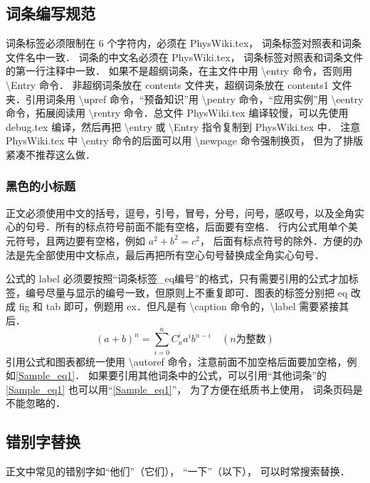 \subsection{词条编写规范}

词条标签必须限制在 6 个字符内，必须在 PhysWiki.tex， 词条标签对照表和词条文件名中一致． 词条的中文名必须在 PhysWiki.tex， 词条标签对照表和词条文件的第一行注释中一致． 如果不是超纲词条，在主文件中用 \textbackslash entry 命令，否则用 \textbackslash Entry 命令． 非超纲词条放在 contents 文件夹，超纲词条放在 contents1 文件夹．引用词条用 \textbackslash upref 命令，“预备知识”用 \textbackslash pentry 命令，“应用实例”用 \textbackslash eentry 命令，拓展阅读用 \textbackslash rentry 命令．总文件 PhysWiki.tex 编译较慢，可以先使用 debug.tex 编译，然后再把 \textbackslash entry 或 \textbackslash Entry 指令复制到 PhysWiki.tex 中． 注意 PhysWiki.tex 中 \textbackslash entry 命令的后面可以用 \textbackslash newpage 命令强制换页， 但为了排版紧凑不推荐这么做．

\subsubsection{黑色的小标题}

正文必须使用中文的括号，逗号，引号，冒号，分号，问号，感叹号，以及全角实心的句号．所有的标点符号前面不能有空格，后面要有空格． 行内公式用单个美元符号，且两边要有空格，例如 $a^2+b^2=c^2$， 后面有标点符号的除外．方便的办法是先全部使用中文标点，最后再把所有空心句号替换成全角实心句号．

公式的 label 必须要按照“词条标签\_eq编号”的格式，只有需要引用的公式才加标签，编号尽量与显示的编号一致，但原则上不重复即可．图表的标签分别把 eq 改成 fig 和 tab 即可，例题用 ex．但凡是有 \textbackslash caption 命令的，\textbackslash label 需要紧接其后．
\begin{equation}\label{Sample_eq1}
(a+b)^n = \sum_{i=0}^n C_n^i a^i b^{n-i} \quad (n\text{为整数})
\end{equation}
引用公式和图表都统一使用 \textbackslash autoref 命令，注意前面不加空格后面要加空格，例如\autoref{Sample_eq1}． 如果要引用其他词条中的公式，可以引用“其他词条”的\autoref{Sample_eq1} 也可以用“\autoref{Sample_eq1}”， 为了方便在纸质书上使用， 词条页码是不能忽略的．

\subsection{错别字替换}
正文中常见的错别字如“他们”（它们）， “一下”（以下）， 可以时常搜索替换．

